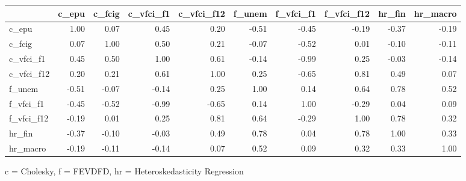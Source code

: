 

\begin{tabular*}{\linewidth}{@{\extracolsep{\fill}}l|rrrrrrrrr}
\toprule
 & c\_epu & c\_fcig & c\_vfci\_f1 & c\_vfci\_f12 & f\_unem & f\_vfci\_f1 & f\_vfci\_f12 & hr\_fin & hr\_macro \\ 
\midrule\addlinespace[2.5pt]
c\_epu & 1.00 & 0.07 & 0.45 & 0.20 & -0.51 & -0.45 & -0.19 & -0.37 & -0.19 \\ 
c\_fcig & 0.07 & 1.00 & 0.50 & 0.21 & -0.07 & -0.52 & 0.01 & -0.10 & -0.11 \\ 
c\_vfci\_f1 & 0.45 & 0.50 & 1.00 & 0.61 & -0.14 & -0.99 & 0.25 & -0.03 & -0.14 \\ 
c\_vfci\_f12 & 0.20 & 0.21 & 0.61 & 1.00 & 0.25 & -0.65 & 0.81 & 0.49 & 0.07 \\ 
f\_unem & -0.51 & -0.07 & -0.14 & 0.25 & 1.00 & 0.14 & 0.64 & 0.78 & 0.52 \\ 
f\_vfci\_f1 & -0.45 & -0.52 & -0.99 & -0.65 & 0.14 & 1.00 & -0.29 & 0.04 & 0.09 \\ 
f\_vfci\_f12 & -0.19 & 0.01 & 0.25 & 0.81 & 0.64 & -0.29 & 1.00 & 0.78 & 0.32 \\ 
hr\_fin & -0.37 & -0.10 & -0.03 & 0.49 & 0.78 & 0.04 & 0.78 & 1.00 & 0.33 \\ 
hr\_macro & -0.19 & -0.11 & -0.14 & 0.07 & 0.52 & 0.09 & 0.32 & 0.33 & 1.00 \\ 
\bottomrule
\end{tabular*}
\begin{minipage}{\linewidth}
c = Cholesky, f = FEVDFD, hr = Heteroskedasticity Regression\\
\end{minipage}


